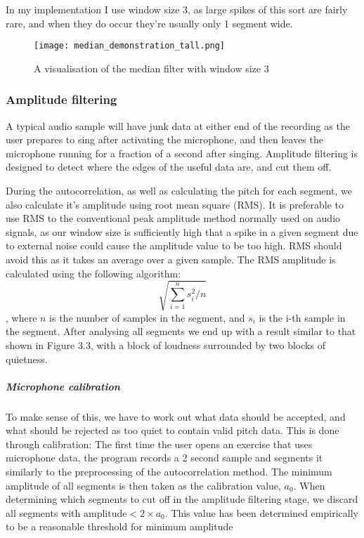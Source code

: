 In my implementation I use window size 3, as large spikes of this sort are fairly rare, and when they do occur they're usually only 1 segment wide.

\begin{figure}
	\centering
    \texttt{[image: median\_demonstration\_tall.png]}
	\caption{A visualisation of the median filter with window size 3}
\end{figure}


\subsubsection{Amplitude filtering}
A typical audio sample will have junk data at either end of the recording as the user prepares to sing after activating the microphone, and then leaves the microphone running for a fraction of a second after singing. Amplitude filtering is designed to detect where the edges of the useful data are, and cut them off.

During the autocorrelation, as well as calculating the pitch for each segment, we also calculate it's amplitude using root mean square (RMS). It is preferable to use RMS to the conventional peak amplitude method normally used on audio signals, as our window size is sufficiently high that a spike in a given segment due to external noise could cause the amplitude value to be too high. RMS should avoid this as it takes an average over a given sample. The RMS amplitude is calculated using the following algorithm:
 \[\sqrt{\sum_{i=1}^{n} s_i^2/n}\], where \(n\) is the number of samples in the segment, and \(s_i\) is the i-th sample in the segment. After analysing all segments we end up with a result similar to that shown in Figure 3.3, with a block of loudness surrounded by two blocks of quietness.

\subparagraph{Microphone calibration}
To make sense of this, we have to work out what data should be accepted, and what should be rejected as too quiet to contain valid pitch data. This is done through calibration: The first time the user opens an exercise that uses microphone data, the program records a 2 second sample and segments it similarly to the preprocessing of the autocorrelation method. The minimum amplitude of all segments is then taken as the calibration value, \(a_0\).
When determining which segments to cut off in the amplitude filtering stage, we discard all segments with \(\text{amplitude} < 2 \times a_0\). This value has been determined empirically to be a reasonable threshold for minimum amplitude

